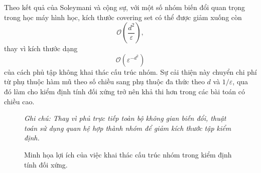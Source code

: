 Theo kết quả của Soleymani và cộng sự, với một số nhóm biến đổi quan trọng trong học máy hình học, kích thước covering set có thể được giảm xuống còn
\begin{equation}
    \mathcal{O}\left(\frac{d^2}{\varepsilon}\right),
    \label{eq:symmetry-testing-covering-efficient}
\end{equation}
thay vì kích thước dạng
\begin{equation}
    \mathcal{O}\left(\varepsilon^{-d^2}\right)
    \label{eq:symmetry-testing-covering-naive}
\end{equation}
của cách phủ tập không khai thác cấu trúc nhóm. Sự cải thiện này chuyển chi phí từ phụ thuộc hàm mũ theo số chiều sang phụ thuộc đa thức theo $d$ và $1/\varepsilon$, qua đó làm cho kiểm định tính đối xứng trở nên khả thi hơn trong các bài toán có chiều cao.

\begin{figure}[H]
    \centering
    
    \caption[Minh họa lợi ích của việc khai thác cấu trúc nhóm]{Minh họa lợi ích của việc khai thác cấu trúc nhóm trong kiểm định tính đối xứng.}
    \label{fig:symmetry-testing-covering}
    
    \vspace{0.15cm}
    \begin{minipage}{0.9\linewidth}
        \centering
        \small\textit{Ghi chú: Thay vì phủ trực tiếp toàn bộ không gian biến đổi, thuật toán sử dụng quan hệ hợp thành nhóm để giảm kích thước tập kiểm định.}
    \end{minipage}
\end{figure}

